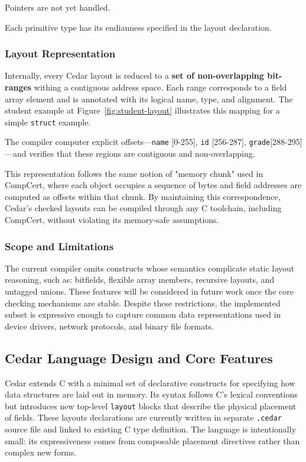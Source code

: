 \noindent
Pointers are not yet handled.

Each primitive type has its endianness specified in the layout declaration.



\subsubsection{Layout Representation}


Internally, every Cedar layout is reduced to a \textbf{set of
non-overlapping bit-ranges} withing a contiguous address space.
Each range corresponds to a field array element and is annotated with its
logical name, type, and alignment.
The student example at Figure~\ref{fig:student-layout} illustrates this mapping for a simple \texttt{struct} example.

The compiler computer explicit offsets—\texttt{name} [0-255],
\texttt{id} [256-287], \texttt{grade}[288-295]—and verifies
that these regions are contiguous and non-overlapping.

This representation follows the same notion of "memory chunk" used in CompCert,
where each object occupies a sequence of bytes and field addresses are
computed as offsets within that chunk.
By maintaining this correspondence, Cedar's checked
layouts can be compiled through any C toolchain, including CompCert,
without violating its memory-safe assumptions.

\subsubsection{Scope and Limitations}
The current compiler omits constructs whose semantics 
complicate static layout reasoning, such as: bitfields,
flexible array members, recursive layouts, and untagged unions.
These features will be considered in future work
once the core checking mechanisms are stable.
Despite these restrictions, the implemented subset is expressive
enough to capture common data representations used in
device drivers, network protocols, and binary file formats.

\subsection{Cedar Language Design and Core Features}
Cedar extends C with a minimal set of declarative constructs for specifying
how data structures are laid out in memory.
Its syntax follows C's lexical conventions but introduces
new top-level \texttt{layout} blocks
that describe the physical
placement of fields.
These layouts declarations are currently written in separate
\texttt{.cedar} source file and linked to existing C type
definition.
The language is intentionally small: its expressiveness
comes from composable placement directives rather than
complex new forms.

